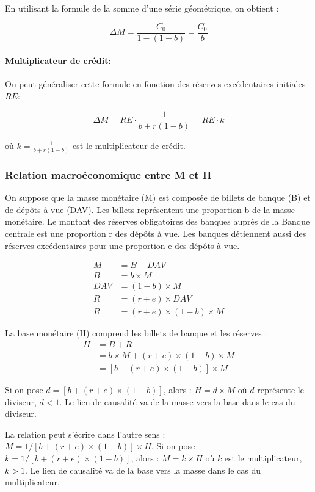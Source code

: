 \documentclass[a4paper, 12pt]{report}
\begin{document}
En utilisant la formule de la somme d'une série géométrique, on obtient :

$$\Delta M = \frac{C_0}{1-(1-b)} = \frac{C_0}{b}$$

\paragraph{Multiplicateur de crédit:}

On peut généraliser cette formule en fonction des réserves excédentaires initiales $RE$:

$$\Delta M = RE \cdot \frac{1}{b + r(1-b)} = RE \cdot k$$

où $k = \frac{1}{b + r(1-b)}$ est le multiplicateur de crédit.
	
\subsubsection{Relation macroéconomique entre M et H}
	
On suppose que la masse monétaire (M) est composée de billets de banque (B) et de dépôts à vue (DAV). Les billets représentent une proportion b de la masse monétaire. Le montant des réserves obligatoires des banques auprès de la Banque centrale est une proportion r des dépôts à vue. Les banques détiennent aussi des réserves excédentaires pour une proportion e des dépôts à vue.

\begin{align*}
	M &= B + DAV \\
	B &= b \times M \\
	DAV &= (1 - b) \times M \\
	R &= (r + e) \times DAV \\
	R &= (r + e) \times (1 - b) \times M
\end{align*}

La base monétaire (H) comprend les billets de banque et les réserves :
\begin{align*}
	H &= B + R \\
	&= b \times M + (r + e) \times (1 - b) \times M \\
	&= [b + (r + e) \times (1 - b)] \times M
\end{align*}

Si on pose $d = [b + (r + e) \times (1 - b)]$, alors : $H = d \times M$ où $d$ représente le diviseur, $d < 1$. Le lien de causalité va de la masse vers la base dans le cas du diviseur.

La relation peut s'écrire dans l'autre sens : $M = 1/[b + (r + e) \times (1 - b)] \times H$. Si on pose $k = 1/[b + (r + e) \times (1 - b)]$, alors : $M = k \times H$ où $k$ est le multiplicateur, $k > 1$. Le lien de causalité va de la base vers la masse dans le cas du multiplicateur.
	
\end{document}
